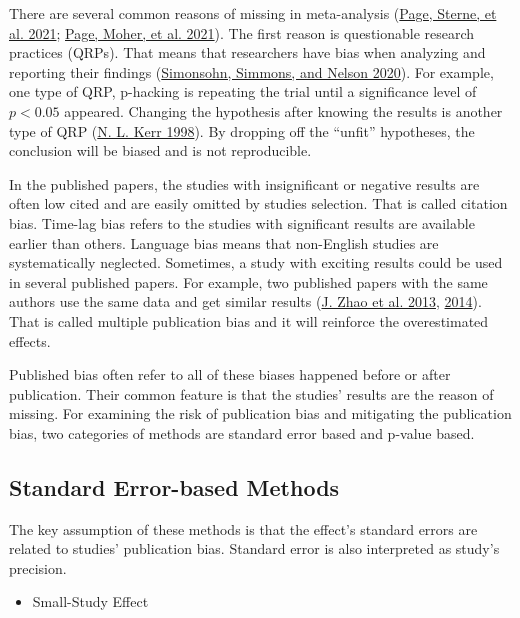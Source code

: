 \documentclass[
  11pt,
  openany]{memoir}
\providecommand{\tightlist}{%
  \setlength{\itemsep}{0pt}\setlength{\parskip}{0pt}}
\begin{document}
There are several common reasons of missing in meta-analysis (\protect\hyperlink{ref-pageInvestigatingDealingPublication2021}{Page, Sterne, et al. 2021}; \protect\hyperlink{ref-pagePRISMA2020Explanation2021}{Page, Moher, et al. 2021}).
The first reason is questionable research practices (QRPs).
That means that researchers have bias when analyzing and reporting their findings (\protect\hyperlink{ref-simonsohnSpecificationCurveAnalysis2020}{Simonsohn, Simmons, and Nelson 2020}).
For example, one type of QRP, p-hacking is repeating the trial until a significance level of \(p<0.05\) appeared.
Changing the hypothesis after knowing the results is another type of QRP (\protect\hyperlink{ref-kerrHARKingHypothesizingResults1998}{N. L. Kerr 1998}).
By dropping off the ``unfit'' hypotheses, the conclusion will be biased and is not reproducible.

In the published papers, the studies with insignificant or negative results are often low cited and are easily omitted by studies selection.
That is called citation bias.
Time-lag bias refers to the studies with significant results are available earlier than others.
Language bias means that non-English studies are systematically neglected.
Sometimes, a study with exciting results could be used in several published papers.
For example, two published papers with the same authors use the same data and get similar results (\protect\hyperlink{ref-zhaoWhatInfluencesMetro2013}{J. Zhao et al. 2013}, \protect\hyperlink{ref-zhaoAnalysisMetroRidership2014}{2014}).
That is called multiple publication bias and it will reinforce the overestimated effects.

Published bias often refer to all of these biases happened before or after publication.
Their common feature is that the studies' results are the reason of missing.
For examining the risk of publication bias and mitigating the publication bias, two categories of methods are standard error based and p-value based.

\hypertarget{standard-error-based-methods}{%
\subsection{Standard Error-based Methods}\label{standard-error-based-methods}}

The key assumption of these methods is that the effect's standard errors are related to studies' publication bias.
Standard error is also interpreted as study's precision.

\begin{itemize}
\tightlist
\item
  Small-Study Effect
\end{itemize}
\end{document}
